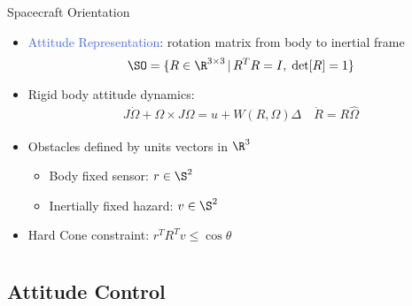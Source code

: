 \documentclass[11pt,professionalfonts]{beamer}
\def\Emph{\textcolor{RoyalBlue}}
\begin{document}
\begin{frame}{Spacecraft Orientation} %

\begin{itemize}

	\item \Emph{Attitude Representation}: rotation matrix from body to inertial frame
	 \[\SO =  \{R\in\R^{3\times 3}\,|\, R^TR=I,\;\mathrm{det}[R]=1\} \]
	\item Rigid body attitude dynamics:
	\begin{gather*}
		J\dot\Omega + \Omega\times J\Omega = u+W(R,\Omega)\Delta \quad \dot R = R\hat\Omega
	\end{gather*}

	\item Obstacles defined by units vectors in \( \R^3 \) 
		\begin{itemize}
			\item Body fixed sensor: \( r \in \S^2\)
			\item Inertially fixed hazard: \( v \in \S^2 \)
		\end{itemize} 
	\item Hard Cone constraint: \( r^T R^T v \leq \cos \theta \)
	
\end{itemize}
\end{frame}   %

\section*{}
\subsection*{Attitude Control}  
\end{document}
